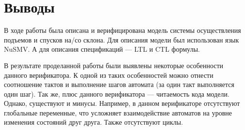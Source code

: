 \newpage
\section{Выводы}
В ходе работы была описана и верифицирована модель системы осуществления подъемов и спусков на/со склона. Для описания модели был использован язык NuSMV. А для описания спецификаций --- LTL и CTL формулы.

В результате проделанной работы были выявлены некоторые особенности данного верификатора. К одной из таких особенностей можно отнести соотношение тактов и выполнение шагов автомата (за один такт выполняется один шаг). Так же, плюс данного верификатора --- читаемость кода модели. Однако, существуют и минусы. Например, в данном верификаторе отсутствуют глобальные переменные, что усложняет взаимодействие автоматов на уровне изменения состояний друг друга. Также отсутствуют циклы.



